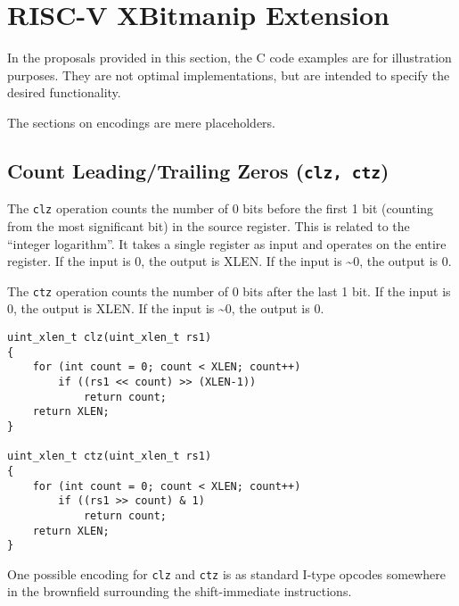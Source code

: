 \chapter{RISC-V XBitmanip Extension}

In the proposals provided in this section, the C code examples are for
illustration purposes. They are not optimal implementations, but are
intended to specify the desired functionality.

The sections on encodings are mere placeholders.


\section{Count Leading/Trailing Zeros (\texttt{clz, ctz})}

The {\tt clz} operation counts the number of 0 bits before the first 1 bit
(counting from the most significant bit) in the source register. This is
related to the ``integer logarithm''. It takes a single register as
input and operates on the entire register. If the input is 0, the output is
XLEN. If the input is \textasciitilde{}0, the output is 0.

The {\tt ctz} operation counts the number of 0 bits after the last 1 bit.
If the input is 0, the output is XLEN. If the input is \textasciitilde{}0,
the output is 0.

\begin{verbatim}
uint_xlen_t clz(uint_xlen_t rs1)
{
    for (int count = 0; count < XLEN; count++)
        if ((rs1 << count) >> (XLEN-1))
            return count;
    return XLEN;
}

uint_xlen_t ctz(uint_xlen_t rs1)
{
    for (int count = 0; count < XLEN; count++)
        if ((rs1 >> count) & 1)
            return count;
    return XLEN;
}
\end{verbatim}



One possible encoding for \texttt{clz} and \texttt{ctz} is as standard I-type opcodes
somewhere in the brownfield surrounding the shift-immediate instructions.

